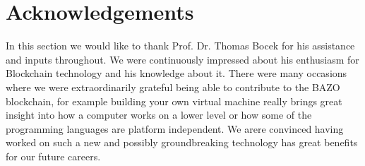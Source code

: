 \chapter*{Acknowledgements}
\thispagestyle{main} %
	In this section we would like to thank Prof. Dr. Thomas Bocek for his assistance and inputs throughout. We were continuously impressed about his enthusiasm for Blockchain technology and his knowledge about it. There were many occasions where we were extraordinarily grateful being able to contribute to the BAZO blockchain, for example building your own virtual machine really brings great insight into how a computer works on a lower level or how some of the programming languages are platform independent. We arere convinced having worked on such a new and possibly groundbreaking technology has great benefits for our future careers.